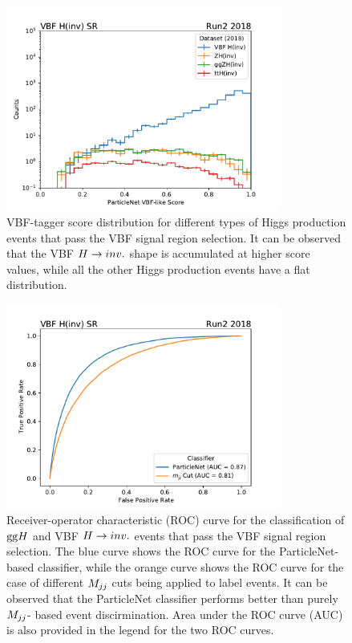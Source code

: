 \begin{figure}[htbp]
    \centering
    \includegraphics[width=0.8\textwidth]{VBFML/sr_vbf_no_veto_all_particlenet_score.pdf}
    \caption{VBF-tagger score distribution for different types of Higgs production events that pass the VBF signal region selection.
    It can be observed that the VBF $H \rightarrow inv.$ shape is accumulated at higher score values, while all the other Higgs production events
    have a flat distribution.}
    \label{fig:score_distribution_hinv_events}
\end{figure}

\begin{figure}[htbp]
    \centering
    \includegraphics[width=0.8\textwidth]{VBFML/ggH_vs_vbfH_ROC.pdf}
    \caption{Receiver-operator characteristic (ROC) curve for the classification of $\mathrm{gg}H$ and VBF $H \rightarrow inv.$ events that pass the VBF signal region
    selection. The blue curve shows the ROC curve for the ParticleNet-based classifier, while the orange curve shows the ROC curve for the case
    of different $M_{jj}$ cuts being applied to label events. It can be observed that the ParticleNet classifier performs better than purely $M_{jj}$-
    based event discirmination. Area under the ROC curve (AUC) is also provided in the legend for the two ROC curves.}
    \label{fig:ggh_vs_vbfh_roc}
\end{figure}

